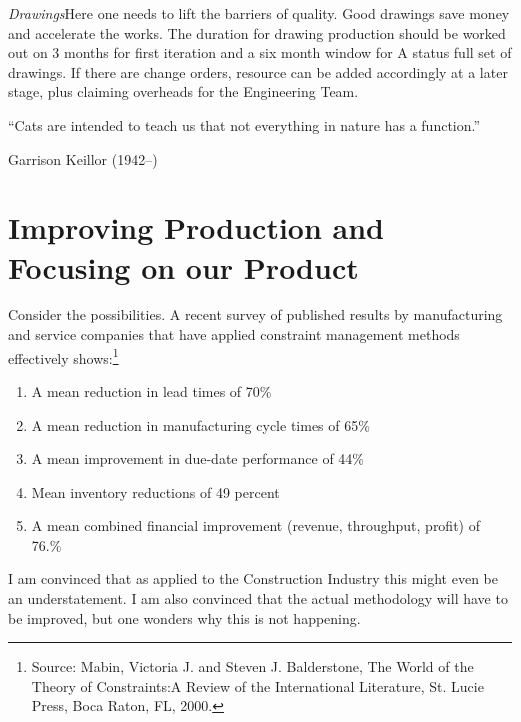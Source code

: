 \textit{Drawings}\quad Here one needs to lift the barriers of quality. Good drawings save money and accelerate the works. The duration for drawing production should be worked out on 3 months for first iteration and a six month window for A status full set of drawings. If there are change orders, resource can be added accordingly at a later stage, plus claiming overheads for the Engineering Team.

``Cats are intended to teach us that not everything in nature has
a function.''

Garrison Keillor (1942–)

\section{Improving Production and Focusing on our Product}

Consider the possibilities. A recent survey of published results by manufacturing
and service companies that have applied constraint management
methods effectively shows:\footnote{Source: Mabin, Victoria J. and Steven J. Balderstone,
The World of the Theory of Constraints:A Review of the International Literature, St. Lucie Press, Boca Raton, FL, 2000.}

\begin{enumerate}
\item A mean reduction in lead times of 70\%

\item A mean reduction in manufacturing cycle times of 65\%

\item A mean improvement in due-date performance of 44\%

\item Mean inventory reductions of 49 percent

\item A mean combined financial improvement (revenue, throughput,
profit) of 76.\%

\end{enumerate}

I am convinced that as applied to the Construction Industry this might even be an understatement. I am also convinced that the actual methodology will have to be improved, but one wonders why this is not happening.

